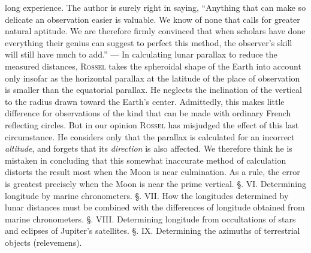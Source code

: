 long experience. The author is surely right in saying, “Anything that can make so delicate an observation easier is valuable. We know of none that calls for greater natural aptitude. We are therefore firmly convinced that when scholars have done everything their genius can suggest to perfect this method, the observer’s skill will still have much to add.” — In calculating lunar parallax to reduce the measured distances, \textsc{Rossel} takes the spheroidal shape of the Earth into account only insofar as the horizontal parallax at the latitude of the place of observation is smaller than the equatorial parallax. He neglects the inclination of the vertical to the radius drawn toward the Earth's center. Admittedly, this makes little difference for observations of the kind that can be made with ordinary French reflecting circles. But in our opinion \textsc{Rossel} has misjudged the effect of this last circumstance. He considers only that the parallax is calculated for an incorrect \emph{altitude}, and forgets that its \emph{direction} is also affected. We therefore think he is mistaken in concluding that this somewhat inaccurate method of calculation distorts the result most when the Moon is near culmination. As a rule, the error is greatest precisely when the Moon is near the prime vertical. §. VI. Determining longitude by marine chronometers. §. VII. How the longitudes determined by lunar distances must be combined with the differences of longitude obtained from marine chronometers. §. VIII. Determining longitude from occultations of stars and eclipses of Jupiter's satellites. §. IX. Determining the azimuths of terrestrial objects (relevemens).

